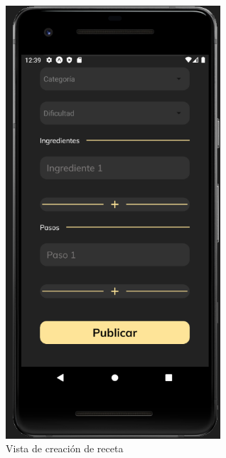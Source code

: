 \begin{figure}[!h]
  \centering
  \includegraphics[width=8cm, scale=1]{Images/Imagenes/add2.png}
  \caption{Vista de creación de receta}
  \label{fig:add2}
\end{figure}

